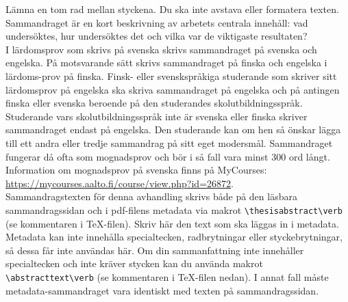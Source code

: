 \documentclass[english, 12pt, a4paper, elec, utf8, a-2b, online]{aaltothesis}
\begin{document}
\newpage

\begin{abstractpage}[swedish]
  Lämna en tom rad mellan styckena. Du ska inte avstava eller formatera texten.\\

  \noindent
  Sammandraget är en kort beskrivning av arbetets centrala innehåll: vad 
  undersöktes, hur undersöktes det och vilka var de viktigaste resultaten?\\

  \noindent
  I lärdomsprov som skrivs på svenska skrivs sammandraget på svenska och 
  engelska. På motsvarande sätt skrivs sammandraget på finska och engelska i 
  lärdoms-prov på finska. Finsk- eller svenskspråkiga studerande som skriver 
  sitt lärdomsprov på engelska ska skriva sammandraget på engelska och på 
  antingen finska eller svenska beroende på den studerandes 
  skolutbildningsspråk. Studerande vars skolutbildningsspråk inte är svenska 
  eller finska skriver sammandraget endast på engelska. Den studerande kan om 
  hen så önskar lägga till ett andra eller tredje sammandrag på sitt eget 
  modersmål. Sammandraget fungerar då ofta som mognadsprov och bör i så fall 
  vara minst 300 ord långt. Information om mognadsprov på svenska finns på 
  MyCourses:\\
  \url{https://mycourses.aalto.fi/course/view.php?id=26872}.\\

  \noindent
  Sammandragstexten för denna avhandling skrivs både på den läsbara 
  sammandragssidan och i pdf-filens metadata via makrot 
  \verb+\thesisabstract\verb+ (se kommentaren i TeX-filen). Skriv här den text 
  som ska läggas in i metadata. Metadata kan inte innehålla specialtecken, 
  radbrytningar eller styckebrytningar, så dessa får inte användas här. Om din 
  sammanfattning inte innehåller specialtecken och inte kräver stycken kan du 
  använda makrot \verb+\abstracttext\verb+ (se kommentaren i TeX-filen nedan). I
  annat fall måste metadata-sammandraget vara identiskt med texten på 
  sammandragssidan.
\end{abstractpage}
\end{document}
